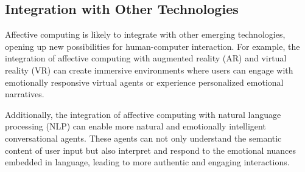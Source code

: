 \subsection{Integration with Other Technologies}

Affective computing is likely to integrate with other emerging technologies, opening up new possibilities for human-computer interaction. 
For example, the integration of affective computing with augmented reality (AR) and virtual reality (VR) 
can create immersive environments where users can engage with emotionally responsive virtual agents or experience personalized emotional narratives.

Additionally, the integration of affective computing with natural language processing (NLP) can enable more natural and emotionally intelligent conversational agents. 
These agents can not only understand the semantic content of user input but also interpret and respond to the emotional nuances embedded in language, 
leading to more authentic and engaging interactions.